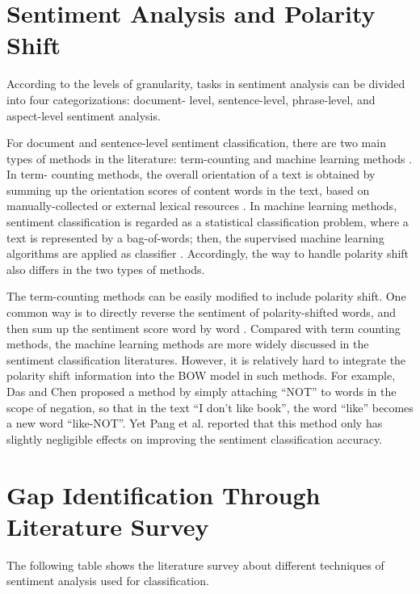 \documentclass[oneside,a4paper,12pt]{pictreport}
\begin{document}
\section{Sentiment Analysis and Polarity Shift}
\hspace{1.1cm}According to the levels of granularity, tasks in sentiment
analysis can be divided into four categorizations: document-
level, sentence-level, phrase-level, and aspect-level sentiment analysis.
\par 
For document and sentence-level sentiment classification, 
there are two main types of methods in the literature:
term-counting and machine learning methods \cite{yahoo} \cite{pang} \cite{pang2008} \cite{ruiEnssemble} . In term-
counting methods, the overall orientation of a text is
obtained by summing up the orientation scores of content
words in the text, based on manually-collected or external
lexical resources \cite{turney} \cite{turney1}. In machine learning methods,
sentiment classification is regarded as a statistical 
classification problem, where a text is represented by a 
bag-of-words; then, the supervised machine learning algorithms
are applied as classifier \cite{pang}. Accordingly, 
the way to handle polarity shift also differs in the two types of methods.
\par
The term-counting methods can be easily modified to
include polarity shift. One common way is to directly
reverse the sentiment of polarity-shifted words, and then
sum up the sentiment score word by word \cite{valence}. Compared with term counting methods, the machine
learning methods are more widely discussed in the 
sentiment classification literatures. However, it is relatively
hard to integrate the polarity shift information into the
BOW model in such methods. For example, Das and
Chen \cite{yahoo} proposed a method by simply attaching “NOT”
to words in the scope of negation, so that in the text “I
don’t like book”, the word “like” becomes a new word “like-NOT”. Yet Pang et al. \cite{pang} reported that this method only
has slightly negligible effects on improving the sentiment
classification accuracy.
\newpage




\section{Gap Identification Through Literature Survey}

The following table shows the literature survey about different techniques of sentiment analysis used for classification. 
\end{document}
